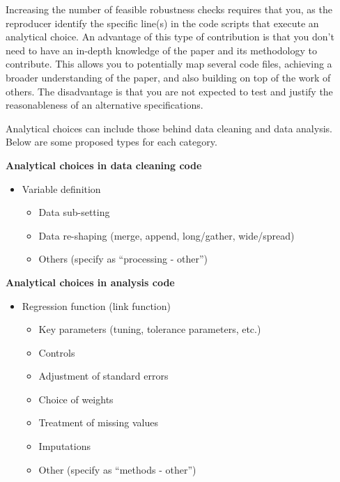 \documentclass[]{book}
\providecommand{\tightlist}{%
  \setlength{\itemsep}{0pt}\setlength{\parskip}{0pt}}
\begin{document}
Increasing the number of feasible robustness checks requires that you, as the reproducer identify the specific line(s) in the code scripts that execute an analytical choice. An advantage of this type of contribution is that you don't need to have an in-depth knowledge of the paper and its methodology to contribute. This allows you to potentially map several code files, achieving a broader understanding of the paper, and also building on top of the work of others. The disadvantage is that you are not expected to test and justify the reasonableness of an alternative specifications.

Analytical choices can include those behind data cleaning and data analysis. Below are some proposed types for each category.

\textbf{Analytical choices in data cleaning code}

\begin{itemize}
\tightlist
\item
  Variable definition

  \begin{itemize}
  \tightlist
  \item
    Data sub-setting
  \item
    Data re-shaping (merge, append, long/gather, wide/spread)
  \item
    Others (specify as ``processing - other'')
  \end{itemize}
\end{itemize}

\textbf{Analytical choices in analysis code}

\begin{itemize}
\tightlist
\item
  Regression function (link function)

  \begin{itemize}
  \tightlist
  \item
    Key parameters (tuning, tolerance parameters, etc.)
  \item
    Controls
  \item
    Adjustment of standard errors
  \item
    Choice of weights
  \item
    Treatment of missing values
  \item
    Imputations
  \item
    Other (specify as ``methods - other'')
  \end{itemize}
\end{itemize}
\end{document}
